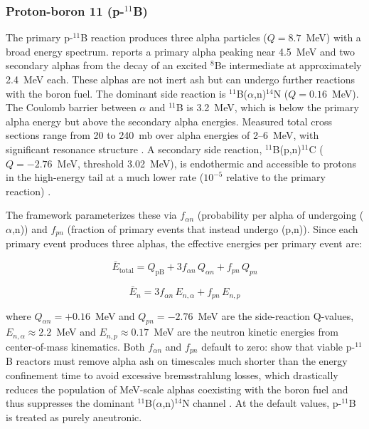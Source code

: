 \documentclass{article}
\begin{document}
\subsubsection{\texorpdfstring{Proton-boron 11 (p-${}^{11}$B)}{Proton-boron 11 (p-11B)}}
The primary p-${}^{11}$B reaction produces three alpha particles
($Q = 8.7$~MeV) with a broad energy spectrum. \citet{dmitriev2009} reports
a primary alpha peaking near 4.5~MeV and two secondary alphas from the
decay of an excited ${}^8$Be intermediate at approximately 2.4~MeV each. These alphas
are not inert ash but can undergo further reactions with the boron fuel.
The dominant side reaction is ${}^{11}$B($\alpha$,n)${}^{14}$N ($Q = 0.16$~MeV).
The Coulomb barrier between $\alpha$ and ${}^{11}$B is 3.2~MeV, which is
below the primary alpha energy but above the secondary alpha energies.
Measured total cross sections range from 20 to 240~mb
over alpha energies of 2--6~MeV, with significant resonance structure
\citep{prior2017}. A secondary side reaction,
${}^{11}$B(p,n)${}^{11}$C ($Q = -2.76$~MeV, threshold 3.02~MeV),
is endothermic and accessible to protons in the high-energy tail at a much lower rate
($10^{-5}$ relative to the primary reaction)
\citep{putvinski2019}.

The framework parameterizes these via $f_{\alpha n}$ (probability per
alpha of undergoing ($\alpha$,n)) and $f_{pn}$ (fraction of primary
events that instead undergo (p,n)). Since each primary event produces
three alphas, the effective energies per primary event are:

\begin{equation}
\label{eq:pb11-etotal}
\bar{E}_{\text{total}} = Q_{\text{pB}} + 3 f_{\alpha n} \, Q_{\alpha n}
  + f_{pn} \, Q_{pn}
\end{equation}

\begin{equation}
\label{eq:pb11-eneutron}
\bar{E}_n = 3 f_{\alpha n} \, E_{n,\alpha} + f_{pn} \, E_{n,p}
\end{equation}

\noindent where $Q_{\alpha n} = +0.16$~MeV and $Q_{pn} = -2.76$~MeV
are the side-reaction Q-values, $E_{n,\alpha} \approx 2.2$~MeV and
$E_{n,p} \approx 0.17$~MeV are the neutron kinetic energies from
center-of-mass kinematics.
Both $f_{\alpha n}$ and $f_{pn}$ default to zero:
\citet{ochs2025} show that viable p-${}^{11}$B reactors must remove
alpha ash on timescales much shorter than the energy confinement time
to avoid excessive bremsstrahlung losses, which drastically reduces the
population of MeV-scale alphas coexisting with the boron fuel and thus
suppresses the dominant ${}^{11}$B($\alpha$,n)${}^{14}$N channel
\citep{hora2021}. At the default values, p-${}^{11}$B is treated as
purely aneutronic.
\end{document}
